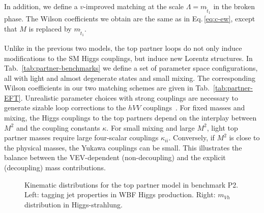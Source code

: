 In addition, we define a $v$-improved matching at the scale $\Lambda =
m_{\tilde{t}_{1}}$ in the broken phase. The Wilson coefficients we
obtain are the same as in Eq.\,\eqref{eq:c-ew}, except that $M$ is
replaced by $m_{\tilde{t}_{1}}$.  \medskip

Unlike in the previous two models, the top partner loops do not only
induce modifications to the SM Higgs couplings, but induce new Lorentz
structures.  In Tab.~\ref{tab:partner-benchmarks} we define a set of
parameter space configurations, all with light and almost degenerate
states and small mixing. The corresponding Wilson coefficients in our
two matching schemes are given in Tab.~\ref{tab:partner-EFT}.
Unrealistic parameter choices with strong couplings are necessary to
generate sizable loop corrections to the $hVV$
couplings~\cite{Hollik:2008xn}. For fixed masses and mixing, the Higgs
couplings to the top partners depend on the interplay between $M^2$
and the coupling constants $\kappa$. For small mixing and large $M^2$,
light top partner masses require large four-scalar couplings
$\kappa_{ii}$.  Conversely, if $M^2$ is close to the physical masses,
the Yukawa couplings can be small.  This illustrates the balance
between the VEV-dependent (non-decoupling) and the explicit
(decoupling) mass contributions.

\begin{figure}[t] \centering
  \caption{Kinematic distributions for the top partner model in
benchmark P2.  Left: tagging jet properties in WBF Higgs production.
Right: $m_{Vh}$ distribution in Higgs-strahlung.}
  \label{fig:validity_partners_distributions}
\end{figure}

